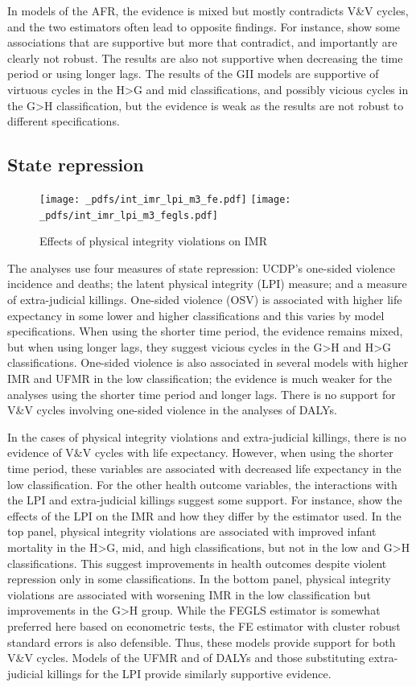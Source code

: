 \documentclass[12pt]{article}
\begin{document}
In models of the AFR, the evidence is mixed but mostly contradicts V\&V cycles, and the two estimators often lead to opposite findings. For instance,  show some associations that are supportive but more that contradict, and importantly are clearly not robust. The results are also not supportive when decreasing the time period or using longer lags.
The results of the GII models are supportive of virtuous cycles in the H>G and mid classifications, and possibly vicious cycles in the G>H classification, but the evidence is weak as the results are not robust to different specifications.

\subsection{State repression}

\begin{figure}[!htb]
    \centering
    \caption{Effects of physical integrity violations on IMR}
    \label{int_imr_lpi}
    \texttt{[image: \_pdfs/int\_imr\_lpi\_m3\_fe.pdf]}
    \texttt{[image: \_pdfs/int\_imr\_lpi\_m3\_fegls.pdf]}
\end{figure}

The analyses use four measures of state repression: UCDP's one-sided violence incidence and deaths; the latent physical integrity (LPI) measure; and a measure of extra-judicial killings. One-sided violence (OSV) is associated with higher life expectancy in some lower and higher classifications and this varies by model specifications. When using the shorter time period, the evidence remains mixed, but when using longer lags, they suggest vicious cycles in the G>H and H>G classifications. One-sided violence is also associated in several models with higher IMR and UFMR in the low classification; the evidence is much weaker for the analyses using the shorter time period and longer lags. There is no support for V\&V cycles involving one-sided violence in the analyses of DALYs.

In the cases of physical integrity violations and extra-judicial killings, there is no evidence of V\&V cycles with life expectancy. However, when using the shorter time period, these variables are associated with decreased life expectancy in the low classification. For the other health outcome variables, the interactions with the LPI and extra-judicial killings suggest some support. For instance,  show the effects of the LPI on the IMR and how they differ by the estimator used. In the top panel, physical integrity violations are associated with improved infant mortality in the H>G, mid, and high classifications, but not in the low and G>H classifications. This suggest improvements in health outcomes despite violent repression only in some classifications. In the bottom panel, physical integrity violations are associated with worsening IMR in the low classification but improvements in the G>H group. While the FEGLS estimator is somewhat preferred here based on econometric tests, the FE estimator with cluster robust standard errors is also defensible. Thus, these models provide support for both V\&V cycles. Models of the UFMR and of DALYs and those substituting extra-judicial killings for the LPI provide similarly supportive evidence.
\end{document}

